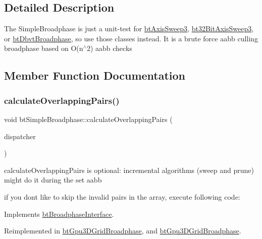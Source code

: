 \subsection{Detailed Description}
The Simple\+Broadphase is just a unit-\/test for \hyperlink{classbtAxisSweep3}{bt\+Axis\+Sweep3}, \hyperlink{classbt32BitAxisSweep3}{bt32\+Bit\+Axis\+Sweep3}, or \hyperlink{structbtDbvtBroadphase}{bt\+Dbvt\+Broadphase}, so use those classes instead. It is a brute force aabb culling broadphase based on O(n$^\wedge$2) aabb checks 

\subsection{Member Function Documentation}
\mbox{\label{classbtSimpleBroadphase_ac899d483e888fa132677125c88991de8}} 
\subsubsection{\texorpdfstring{calculate\+Overlapping\+Pairs()}{calculateOverlappingPairs()}}
{\footnotesize\ttfamily void bt\+Simple\+Broadphase\+::calculate\+Overlapping\+Pairs (\begin{DoxyParamCaption}\item[{\hyperlink{classbtDispatcher}{bt\+Dispatcher} $\ast$}]{dispatcher }\end{DoxyParamCaption})\hspace{0.3cm}{\ttfamily [virtual]}}



calculate\+Overlapping\+Pairs is optional\+: incremental algorithms (sweep and prune) might do it during the set aabb 

if you don\textquotesingle{}t like to skip the invalid pairs in the array, execute following code\+: 

Implements \hyperlink{classbtBroadphaseInterface_a27e29cb6fd31e5fe626e7ba973e67ddb}{bt\+Broadphase\+Interface}.



Reimplemented in \hyperlink{classbtGpu3DGridBroadphase_ad25b335c5cf7be1f4eee024ff91e5635}{bt\+Gpu3\+D\+Grid\+Broadphase}, and \hyperlink{classbtGpu3DGridBroadphase_ac59344854cc1f33ded7cdedd72c7a454}{bt\+Gpu3\+D\+Grid\+Broadphase}.

